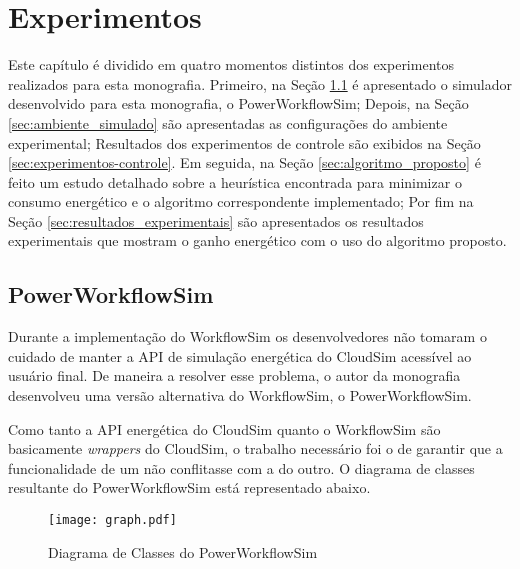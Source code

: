 \chapter{Experimentos}
\label{cap:experimentos}
Este capítulo é dividido em quatro momentos distintos dos experimentos realizados
para esta monografia. Primeiro, na Seção \ref{sec:powerworkflowsim} é
apresentado o simulador desenvolvido para esta monografia, o PowerWorkflowSim;
Depois, na Seção \ref{sec:ambiente_simulado} são
apresentadas as configurações do ambiente experimental; Resultados dos 
experimentos de controle são exibidos na Seção \ref{sec:experimentos-controle}.
Em seguida, na Seção
\ref{sec:algoritmo_proposto} é feito um estudo detalhado sobre a heurística
encontrada para minimizar o consumo energético e o algoritmo correspondente
implementado; Por fim na Seção \ref{sec:resultados_experimentais} são
apresentados os resultados experimentais que mostram o ganho energético com
o uso do algoritmo proposto.

\section{PowerWorkflowSim}
\label{sec:powerworkflowsim}
Durante a implementação do WorkflowSim os desenvolvedores não tomaram o cuidado
de manter a API de simulação energética do CloudSim acessível ao usuário final.
De maneira a resolver esse problema, o autor da monografia desenvolveu uma versão
alternativa do WorkflowSim, o PowerWorkflowSim.

Como tanto a API energética do CloudSim quanto o WorkflowSim são basicamente 
\emph{wrappers} do CloudSim, o trabalho necessário foi o de garantir que 
a funcionalidade de um não conflitasse com a do outro. O diagrama de classes
resultante do PowerWorkflowSim está representado abaixo.

\begin{figure}[ht]
\centering
\texttt{[image: graph.pdf]}
\caption{Diagrama de Classes do PowerWorkflowSim}
\label{fig:classes_powerworkflowsim}
\end{figure}


